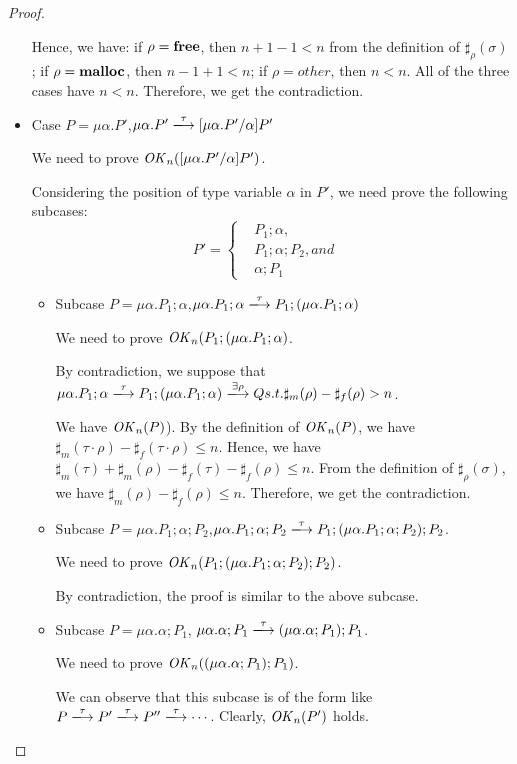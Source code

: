 \begin{proof}
\begin{itemize}
   Hence, we have: if \(\rho = \mathbf{free}\), then \(n + 1 - 1 < n\) from
   the definition of \(\sharp_{\rho}(\sigma)\); if \(\rho = \mathbf{malloc}\),
   then \( n - 1 + 1 < n \); if \( \rho = other\), then \( n < n
   \). All of the three cases have \(n < n\). Therefore, we get the
   contradiction.

 \item Case  \(P = \mu\alpha.P'\),\Rtab  \( \mu\alpha.P' \xlongrightarrow{\tau} [\mu\alpha.P'\slash\alpha]P'\)

   We need to prove \(\mathit{OK}_n([\mu\alpha.P'\slash\alpha]P')\).

   Considering the position of type variable \(\alpha\) in \(P'\), we need prove the following subcases:
$$
   P'=\left\{
   \begin{aligned}
     &P_1;\alpha,& \\
     &P_1;\alpha;P_2, and&  \\
     &\alpha;P_1&
   \end{aligned}
   \right.
$$

   \begin{itemize}
   \item Subcase \(P = \mu\alpha.P_1;\alpha\),\Rtab \(
     \mu\alpha.P_1;\alpha \xlongrightarrow{\tau} P_1;(\mu\alpha.P_1;\alpha) \)
     
     We need to prove \(\mathit{OK}_n(P_1;(\mu\alpha.P_1;\alpha) \).

     By contradiction, we suppose that \( \mu\alpha.P_1;\alpha
     \xlongrightarrow{\tau} P_1;(\mu\alpha.P_1;\alpha)
     \xlongrightarrow{\exists \rho} Q s.t.  \sharp_m(\rho) -
     \sharp_f(\rho) > n\).

     We have \(\mathit{OK}_n(P)\)).  By the definition of \(\mathit{OK}_n(P)\), we
     have \(\sharp_m(\tau \cdot \rho) -\sharp_f(\tau \cdot \rho) \le
     n\). Hence, we have \(\sharp_m(\tau) + \sharp_m(\rho) -
     \sharp_f(\tau) -\sharp_f(\rho) \le n\).  From the definition of
     \(\sharp_\rho(\sigma)\), we have \(\sharp_m(\rho) -\sharp_f(\rho)
  \le n\). Therefore, we get the contradiction.

\item Subcase  \(P = \mu\alpha.P_1;\alpha;P_2\),\Rtab \(\mu\alpha.P_1;\alpha;P_2 \xlongrightarrow{\tau} P_1;(\mu\alpha.P_1;\alpha;P_2);P_2 \).

  We need to prove  \(\mathit{OK}_n(P_1;(\mu\alpha.P_1;\alpha;P_2);P_2) \).

  By contradiction, the proof is similar to the above subcase.

     \item Subcase \(P = \mu\alpha.\alpha;P_1\),\Rtab
       \(\mu\alpha.\alpha;P_1 \xlongrightarrow{\tau}
       (\mu\alpha.\alpha;P_1);P_1 \).

       We need to prove \(\mathit{OK}_n((\mu\alpha.\alpha;P_1);P_1)\).

       We can observe that this subcase is of the form like
       \(P\xlongrightarrow{\tau}P'\xlongrightarrow{\tau}P''\xlongrightarrow{\tau}
       \cdots\). Clearly, \(\mathit{OK}_n(P')\) holds.

     \end{itemize}

\end{itemize}
\end{proof}

